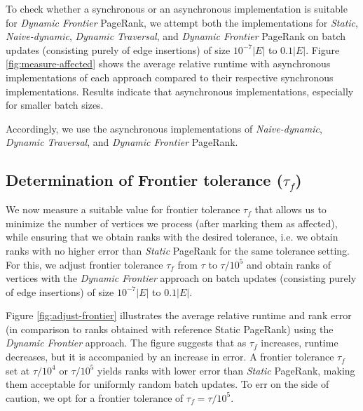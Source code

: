 To check whether a synchronous or an asynchronous implementation is suitable for \textit{Dynamic Frontier} PageRank, we attempt both the implementations for \textit{Static}, \textit{Naive-dynamic}, \textit{Dynamic Traversal}, and \textit{Dynamic Frontier} PageRank on batch updates (consisting purely of edge insertions) of size $10^{-7}|E|$ to $0.1|E|$. Figure \ref{fig:measure-affected} shows the average relative runtime with asynchronous implementations of each approach compared to their respective synchronous implementations. Results indicate that asynchronous implementations, especially for smaller batch sizes. Accordingly, we use the asynchronous implementations of \textit{Naive-dynamic}, \textit{Dynamic Traversal}, and \textit{Dynamic Frontier} PageRank.




\subsection{Determination of Frontier tolerance ($\tau_f$)}

We now measure a suitable value for frontier tolerance $\tau_f$ that allows us to minimize the number of vertices we process (after marking them as affected), while ensuring that we obtain ranks with the desired tolerance, i.e. we obtain ranks with no higher error than \textit{Static} PageRank for the same tolerance setting. For this, we adjust frontier tolerance $\tau_f$ from $\tau$ to $\tau / 10^5$ and obtain ranks of vertices with the \textit{Dynamic Frontier} approach on batch updates (consisting purely of edge insertions) of size $10^{-7}|E|$ to $0.1|E|$.

Figure \ref{fig:adjust-frontier} illustrates the average relative runtime and rank error (in comparison to ranks obtained with reference Static PageRank) using the \textit{Dynamic Frontier} approach. The figure suggests that as $\tau_f$ increases, runtime decreases, but it is accompanied by an increase in error. A frontier tolerance $\tau_f$ set at $\tau/10^4$ or $\tau/10^5$ yields ranks with lower error than \textit{Static} PageRank, making them acceptable for uniformly random batch updates. To err on the side of caution, we opt for a frontier tolerance of $\tau_f = \tau/10^5$.








